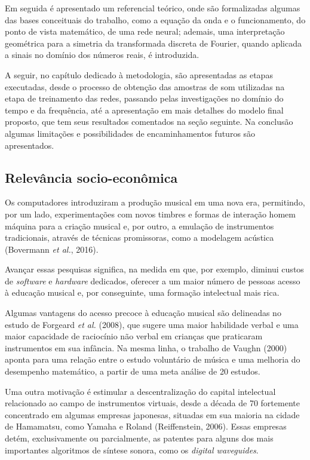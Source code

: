 \documentclass[]{article}
\begin{document}
Em seguida é apresentado um referencial teórico, onde são formalizadas
algumas das bases conceituais do trabalho, como a equação da onda e o
funcionamento, do ponto de vista matemático, de uma rede neural;
ademais, uma interpretação geométrica para a simetria da transformada
discreta de Fourier, quando aplicada a sinais no domínio dos números
reais, é introduzida.

A seguir, no capítulo dedicado à metodologia, são apresentadas as etapas
executadas, desde o processo de obtenção das amostras de som utilizadas
na etapa de treinamento das redes, passando pelas investigações no
domínio do tempo e da frequência, até a apresentação em mais detalhes do
modelo final proposto, que tem seus resultados comentados na seção
seguinte. Na conclusão algumas limitações e possibilidades de
encaminhamentos futuros são apresentados.

\hypertarget{relevuxe2ncia-socio-econuxf4mica}{%
\subsection{Relevância
socio-econômica}\label{relevuxe2ncia-socio-econuxf4mica}}

Os computadores introduziram a produção musical em uma nova era,
permitindo, por um lado, experimentações com novos timbres e formas de
interação homem máquina para a criação musical e, por outro, a emulação
de instrumentos tradicionais, através de técnicas promissoras, como a
modelagem acústica (Bovermann \emph{et al.}, 2016).

Avançar essas pesquisas significa, na medida em que, por exemplo,
diminui custos de \emph{software} e \emph{hardware} dedicados, oferecer
a um maior número de pessoas acesso à educação musical e, por
conseguinte, uma formação intelectual mais rica.

Algumas vantagens do acesso precoce à educação musical são delineadas no
estudo de Forgeard \emph{et al.} (2008), que sugere uma maior habilidade
verbal e uma maior capacidade de raciocínio não verbal em crianças que
praticaram instrumentos em sua infância. Na mesma linha, o trabalho de
Vaughn (2000) aponta para uma relação entre o estudo voluntário de
música e uma melhoria do desempenho matemático, a partir de uma meta
análise de 20 estudos.

Uma outra motivação é estimular a descentralização do capital
intelectual relacionado ao campo de instrumentos virtuais, desde a
década de 70 fortemente concentrado em algumas empresas japonesas,
situadas em sua maioria na cidade de Hamamatsu, como Yamaha e Roland
(Reiffenstein, 2006). Essas empresas detém, exclusivamente ou
parcialmente, as patentes para alguns dos mais importantes algoritmos de
síntese sonora, como os \emph{digital waveguides}.
\end{document}
